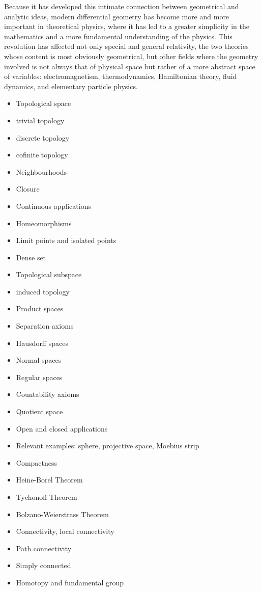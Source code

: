 \documentclass[10pt]{article}
\begin{document}
Because it has developed this intimate connection between geometrical and analytic ideas, modern differential geometry has become more and more important in theoretical physics, where it has led to a greater simplicity in the mathematics and a more fundamental understanding of the physics. This revolution has affected not only special and general relativity, the two theories whose content is most obviously geometrical, but other fields where the geometry involved is not always that of physical space but rather of a more abstract space of variables: electromagnetism, thermodynamics, Hamiltonian theory, fluid dynamics, and elementary particle physics.
\begin{itemize}
	\item Topological space
	\item trivial topology
	\item discrete topology
	\item cofinite topology
	\item Neighbourhoods
	\item Closure
	\item Continuous applications
	\item Homeomorphisms
	\item Limit points and isolated points
	\item Dense set
	\item Topological subspace
	\item induced topology
	\item Product spaces
	\item Separation axioms
	\item Hausdorff spaces
	\item Normal spaces
	\item Regular spaces
	\item Countability axioms
	\item Quotient space
	\item Open and closed applications
	\item Relevant examples: sphere, projective space, Moebius strip
	\item Compactness
	\item Heine-Borel Theorem
	\item Tychonoff Theorem
	\item Bolzano-Weierstrass Theorem
	\item Connectivity, local connectivity
	\item Path connectivity
	\item Simply connected
	\item Homotopy and fundamental group

\end{itemize}
\end{document}
